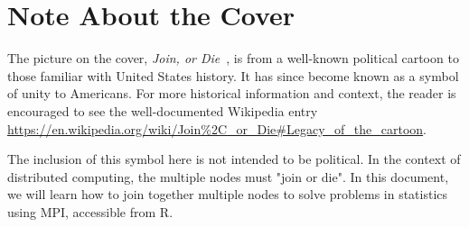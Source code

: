 \chapter*{Note About the Cover}

The picture on the cover, \textit{Join, or Die}~\citep{franklin1754join}, is
from a well-known political cartoon to those familiar with United States
history.  It has since become known as a symbol of unity to Americans.  For more
historical information and context, the reader is encouraged to see the 
well-documented Wikipedia entry 
\url{https://en.wikipedia.org/wiki/Join%2C_or_Die#Legacy_of_the_cartoon}.

The inclusion of this symbol here is not intended to be political.  In the 
context of distributed computing, the multiple nodes must "join or die".  
In this document, we will learn how to join together multiple nodes to 
solve problems in statistics using MPI, accessible from R.
